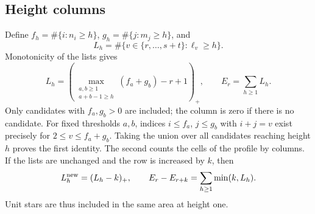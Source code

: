 \documentclass[11pt,a4paper]{article}
\newcommand{\pos}[1]{\left(#1\right)_+}
\theoremstyle{definition}
\begin{document}
\subsection{Height columns}
Define $f_h=\#\{i:n_i\ge h\}$, $g_h=\#\{j:m_j\ge h\}$, and
\[
L_h=\#\{v\in\{r,\ldots,s+t\}:\ell_v\ge h\}.
\]
Monotonicity of the lists gives
\begin{equation}\label{eq:columns}
L_h=\pos{\max_{\substack{a,b\ge1\\a+b-1\ge h}}(f_a+g_b)-r+1},
\qquad E_r=\sum_{h\ge1}L_h.
\end{equation}
Only candidates with $f_a,g_b>0$ are included; the column is zero if there is no candidate. For fixed thresholds $a,b$, indices $i\le f_a$, $j\le g_b$ with $i+j=v$ exist precisely for $2\le v\le f_a+g_b$. Taking the union over all candidates reaching height $h$ proves the first identity. The second counts the cells of the profile by columns.
If the lists are unchanged and the row is increased by $k$, then
\begin{equation}\label{eq:rowloss}
L_h^{\rm new}=(L_h-k)_+,\qquad
E_r-E_{r+k}=\sum_{h\ge1}\min(k,L_h).
\end{equation}
Unit stars are thus included in the same area at height one.
\end{document}
